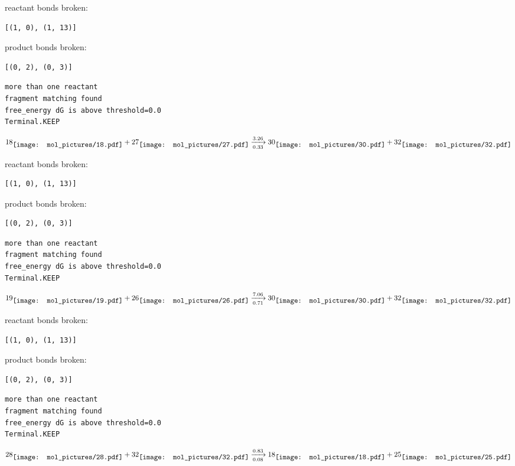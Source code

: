 \documentclass{article}
\begin{document}
reactant bonds broken:\begin{verbatim}
[(1, 0), (1, 13)]
\end{verbatim}
product bonds broken:\begin{verbatim}
[(0, 2), (0, 3)]
\end{verbatim}




\vspace{1cm}
\begin{verbatim}
more than one reactant
fragment matching found
free_energy dG is above threshold=0.0
Terminal.KEEP
\end{verbatim}
$$
18
\raisebox{-.5\height}{\texttt{[image: mol\_pictures/18.pdf]}}
+
27
\raisebox{-.5\height}{\texttt{[image: mol\_pictures/27.pdf]}}
\xrightarrow[0.33]{3.26}
30
\raisebox{-.5\height}{\texttt{[image: mol\_pictures/30.pdf]}}
+
32
\raisebox{-.5\height}{\texttt{[image: mol\_pictures/32.pdf]}}
$$


reactant bonds broken:\begin{verbatim}
[(1, 0), (1, 13)]
\end{verbatim}
product bonds broken:\begin{verbatim}
[(0, 2), (0, 3)]
\end{verbatim}




\vspace{1cm}
\begin{verbatim}
more than one reactant
fragment matching found
free_energy dG is above threshold=0.0
Terminal.KEEP
\end{verbatim}
$$
19
\raisebox{-.5\height}{\texttt{[image: mol\_pictures/19.pdf]}}
+
26
\raisebox{-.5\height}{\texttt{[image: mol\_pictures/26.pdf]}}
\xrightarrow[0.71]{7.06}
30
\raisebox{-.5\height}{\texttt{[image: mol\_pictures/30.pdf]}}
+
32
\raisebox{-.5\height}{\texttt{[image: mol\_pictures/32.pdf]}}
$$


reactant bonds broken:\begin{verbatim}
[(1, 0), (1, 13)]
\end{verbatim}
product bonds broken:\begin{verbatim}
[(0, 2), (0, 3)]
\end{verbatim}




\vspace{1cm}
\begin{verbatim}
more than one reactant
fragment matching found
free_energy dG is above threshold=0.0
Terminal.KEEP
\end{verbatim}
$$
28
\raisebox{-.5\height}{\texttt{[image: mol\_pictures/28.pdf]}}
+
32
\raisebox{-.5\height}{\texttt{[image: mol\_pictures/32.pdf]}}
\xrightarrow[0.08]{0.83}
18
\raisebox{-.5\height}{\texttt{[image: mol\_pictures/18.pdf]}}
+
25
\raisebox{-.5\height}{\texttt{[image: mol\_pictures/25.pdf]}}
$$
\end{document}
